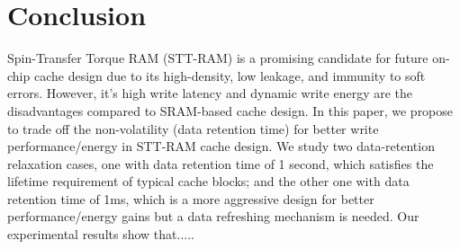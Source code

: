 \section{Conclusion}

Spin-Transfer Torque RAM (STT-RAM) is a promising candidate for future  
on-chip cache design due to its high-density, low leakage, and immunity to 
soft errors.  However, it's high write latency and dynamic
write energy are the disadvantages compared to SRAM-based cache design.
In this paper, we propose to trade off the non-volatility (data retention time)
for better write performance/energy in STT-RAM cache design. We study two
data-retention relaxation cases, one with data retention time of 1 second, which satisfies the lifetime requirement of typical cache blocks; and the other one with data retention time of 1ms, which is a more aggressive design for better performance/energy gains but a data refreshing mechanism is needed. Our 
experimental results show that.....